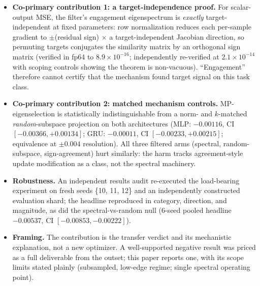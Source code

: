 \begin{itemize}
  \item \textbf{Co-primary contribution 1: a target-independence proof.}
    For scalar-output MSE, the filter's engagement eigenspectrum is
    \emph{exactly} target-independent at fixed parameters: row
    normalization reduces each per-sample gradient to $\pm$(residual sign)
    $\times$ a target-independent Jacobian direction, so permuting targets
    conjugates the similarity matrix by an orthogonal sign matrix
    (verified in fp64 to $8.9\times10^{-16}$; independently re-verified at
    $2.1\times10^{-14}$ with scoping controls showing the theorem is
    non-vacuous). ``Engagement'' therefore cannot certify that the
    mechanism found target signal on this task class.

  \item \textbf{Co-primary contribution 2: matched mechanism controls.}
    MP-eigenselection is statistically indistinguishable from a norm- and
    $k$-matched \emph{random}-subspace projection on both architectures
    (MLP: $-0.00116$, CI $[-0.00366, +0.00134]$; GRU: $-0.00011$, CI
    $[-0.00233, +0.00215]$; equivalence at $\pm 0.004$ resolution). All
    three filtered arms (spectral, random-subspace, sign-agreement) hurt
    similarly: the harm tracks agreement-style update modification as a
    class, not the spectral machinery.

  \item \textbf{Robustness.} An independent results audit re-executed the
    load-bearing experiment on fresh seeds \{10, 11, 12\} and an
    independently constructed evaluation shard; the headline reproduced in
    category, direction, and magnitude, as did the spectral-vs-random
    null (6-seed pooled headline $-0.00537$, CI $[-0.00853, -0.00222]$).

  \item \textbf{Framing.} The contribution is the transfer verdict and its
    mechanistic explanation, not a new optimizer. A well-supported negative
    result was priced as a full deliverable from the outset; this paper
    reports one, with its scope limits stated plainly (subsampled,
    low-edge regime; single spectral operating point).
\end{itemize}
